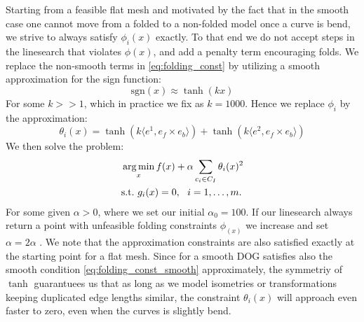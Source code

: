 Starting from a feasible flat mesh and motivated by the fact that in the smooth case one cannot move from a folded to a non-folded model once a curve is bend, we strive to always satisfy $\phi_i(x)$ exactly. To that end we do not accept steps in the linesearch that violates $\phi(x)$, and add a penalty term encouraging folds. We replace the non-smooth terms in \eqref{eq:folding_const} by utilizing a smooth approximation for the sign function:
\begin{equation} \label{eq:sign_smooth_approx}
\text{sgn}(x) \approx \tanh(kx)
\end{equation}
For some $k >> 1$, which in practice we fix as $k = 1000$. Hence we replace $\phi_i$ by the approximation:
\begin{equation} \label{eq:folding_const}
\theta_i(x) = \tanh(k\langle e^1,e_f \times e_b \rangle) +  \tanh(k\langle e^2,e_f \times e_b\rangle)
\end{equation}
We then solve the problem:
\begin{equation} \label{eq:const_opt}
\begin{aligned}
& \operatorname*{arg\,min}_x
f(x) + \alpha \sum_{c_i \in C_{I}} \theta_i(x)^2\\
& \textrm{s.t.}
\text{ } g_i(x) = 0, \ \  i = 1, \ldots, m.
\end{aligned}
\end{equation}
For some given $\alpha > 0$, where we set our initial $\alpha_0 = 100$. If our linesearch always return a point with unfeasible folding constraints $\phi_(x)$ we increase and set $\alpha = 2\alpha$ .
We note that the approximation constraints are also satisfied exactly at the starting point for a flat mesh. Since for a smooth DOG satisfies also the smooth condition \eqref{eq:folding_const_smooth} approximately, the symmetriy of $\tanh$ guarantuees us that as long as we model isometries or transformations keeping duplicated edge lengths similar, the constraint $\theta_i(x)$ will approach even faster to zero, even when the curves is slightly bend.